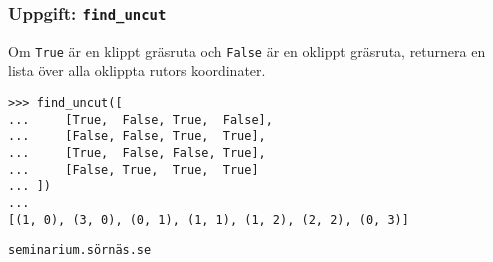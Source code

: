 \documentclass{beamer}
\begin{document}
  \begin{frame}[fragile]
    \frametitle{Uppgift: \texttt{find\_uncut}}

    Om \texttt{True} är en klippt gräsruta och \texttt{False} är en oklippt
    gräsruta, returnera en lista över alla oklippta rutors koordinater.

    \begin{verbatim}
>>> find_uncut([
...     [True,  False, True,  False],
...     [False, False, True,  True],
...     [True,  False, False, True],
...     [False, True,  True,  True]
... ])
...
[(1, 0), (3, 0), (0, 1), (1, 1), (1, 2), (2, 2), (0, 3)]
    \end{verbatim}

    \texttt{seminarium.sörnäs.se}

  \end{frame}
\end{document}
